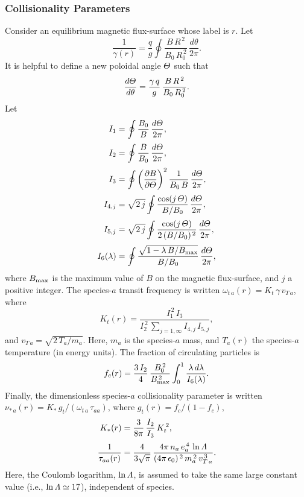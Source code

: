 \documentclass[12pt,prb,aps]{revtex4-1}
\begin{document}
\subsubsection{Collisionality Parameters}
Consider an equilibrium magnetic flux-surface whose label is $r$. 
Let\,\cite{sigmar}
\begin{equation}
\frac{1}{\gamma(r)} =\frac{q}{g}\oint\frac{ B\,R^{\,2}}{B_0\,R_0^{\,2}}\,\frac{d\theta}{2\pi}.
\end{equation}
It is helpful to define a new poloidal angle ${\mit\Theta}$ such that
\begin{equation}
\frac{d{\mit\Theta}}{d\theta} = \frac{\gamma\,q}{g}\,\frac{B\,R^{\,2}}{B_0\,R_0^{\,2}}.
\end{equation}
Let
\begin{align}
I_1 &=\oint \frac{B_0}{B}\,\frac{d{\mit\Theta}}{2\pi},\\[0.5ex]
I_2 &=\oint \frac{B}{B_0}\,\frac{d{\mit\Theta}}{2\pi},\\[0.5ex]
I_3 &=\oint\left(\frac{\partial B}{\partial{\mit\Theta}}\right)^2\frac{1}{B_0\,B}\,\frac{d{\mit\Theta}}{2\pi},\\[0.5ex]
I_{4,j}&= \sqrt{2\,j}\oint\frac{\cos(j\,{\mit\Theta})}{B/B_0}\,\frac{d{\mit\Theta}}{2\pi},\\[0.5ex]
I_{5,j} &= \sqrt{2\,j}\oint\frac{\cos(j\,{\mit\Theta})}{2\,(B/B_0)^{\,2}}\,\frac{d{\mit\Theta}}{2\pi},\\[0.5ex]
I_6(\lambda) &=\oint \frac{\sqrt{1-\lambda\,B/B_{\rm max}}}{B/B_0}\,\frac{d{\mit\Theta}}{2\pi},
\end{align}
where $B_{\rm max}$ is the maximum value of $B$ on the magnetic
flux-surface, and $j$ a positive integer. 
The species-$a$ transit frequency is written
$\omega_{t\,a}(r)= K_t\,\gamma\,v_{T\,a}$,
where 
\begin{equation}\label{cdef}
K_t(r) = \frac{I_1^{\,2}\,I_3}{I_2^{\,2}\,\sum_{j=1,\infty} I_{4,j}\,I_{5,j}},
\end{equation}
and $v_{T\,a} = \sqrt{2\,T_a/m_a}$.  Here, $m_a$ is the
species-$a$ mass, and $T_a(r)$ the species-$a$ temperature (in energy units). The fraction of circulating particles 
is
\begin{equation}
f_c(r) = \frac{3\,I_2}{4}\,\frac{B_0^{\,2}}{B_{\rm max}^{\,2}}
\int_0^1 \frac{\lambda\,d\lambda}{I_6(\lambda)}.
\end{equation}
Finally, the dimensionless species-$a$ collisionality parameter
is written
$\nu_{\ast\,a} (r)= K_\ast\,g_t/(\omega_{t\,a}\,\tau_{aa})$,
where 
$g_t(r) =f_c/(1-f_c)$,
\begin{align}
K_\ast(r) &= \frac{3}{8\pi}\,\frac{I_2}{I_3}\,K_t^{\,2},\\[0.5ex]
\frac{1}{\tau_{aa}(r)}&= \frac{4}{3\sqrt{\pi}}\,\frac{4\pi\,n_a\,e_a^{\,4}\,\ln{\mit\Lambda}}{(4\pi\,\epsilon_0)^{\,2}\,m_a^{\,2}\,v_{T\,a}^{\,3}}.
\end{align}
Here, the Coulomb logarithm, $\ln{\mit\Lambda}$, is assumed to take the same large constant value (i.e., $\ln{\mit\Lambda}\simeq 17$), 
independent of species. 
\end{document}
